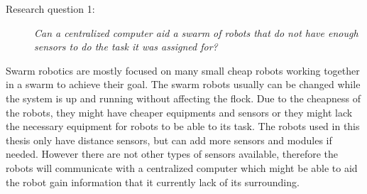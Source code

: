%
%
%


\begin{description}
\item[Research question 1:] {\it Can a centralized computer aid a swarm of robots that do not have enough sensors to do the task it was assigned for?}
\end{description}
Swarm robotics are mostly focused on many small cheap robots working together in a swarm to achieve their goal. The swarm robots usually can be changed while the system is up and running without affecting the flock.
Due to the cheapness of the robots, they might have cheaper equipments and sensors or they might lack the necessary equipment for robots to be able to its task. 
The robots used in this thesis only have distance sensors, but can add more sensors and modules if needed. However there are not other types of sensors available, therefore the robots will communicate with a centralized computer which might be able to aid the robot gain information that it currently lack of its surrounding.


